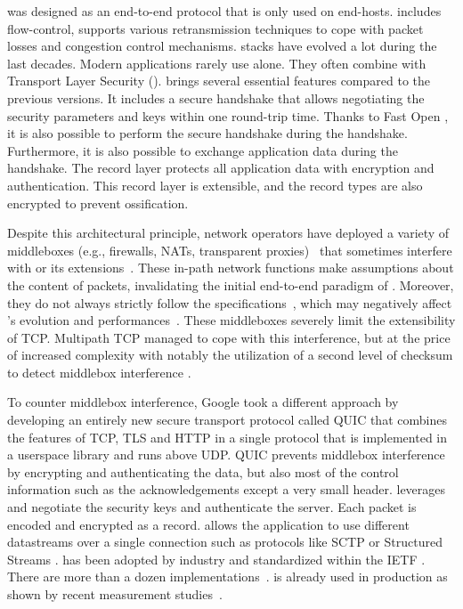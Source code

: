 

\tcp was designed as an end-to-end protocol that is only used on end-hosts.
\tcp includes flow-control, supports various retransmission techniques to cope with packet losses and congestion control mechanisms. \tcp stacks have evolved a lot during the last decades. Modern applications rarely use \tcp alone. They
often combine \tcp with Transport Layer Security (\tls). 
 \cite{rfc8446} brings several essential features compared to the previous versions. It
includes a secure handshake that allows negotiating the security parameters and
keys within one round-trip time. Thanks to \tcp Fast Open
\cite{radhakrishnan2011tcp}, it is also possible to perform the secure handshake
during the \tcp handshake. Furthermore, it is also possible to exchange
application data during the handshake. The  record layer protects all
application data with encryption and authentication. This record layer is
extensible, and the \tls record types are also encrypted to prevent
ossification.

Despite this architectural principle, network operators have deployed a variety
of middleboxes (e.g., firewalls, NATs, transparent proxies)~\cite{mCloud} that
sometimes interfere with \tcp or its extensions~\cite{medina2004measuring,
honda2011still, edeline2019bottom}. These in-path network functions make
assumptions about the content of \tcp packets, invalidating the initial
end-to-end paradigm of \tcp. Moreover, they do not always strictly follow the
\tcp specifications~\cite{honda2011still, hesmans2013tcp}, which may negatively
affect \tcp's evolution and performances~\cite{edeline2020evaluating}. These
middleboxes severely limit the extensibility of TCP. Multipath TCP \cite{rfc8684,raiciu2012hard}
managed to cope with this interference, but at the price of increased complexity
with notably the utilization of a second level of checksum to detect middlebox
interference \cite{raiciu2012hard,hesmans2013tcp}.

To counter middlebox interference, Google took a different approach by developing an
entirely new secure transport protocol called QUIC \cite{langley2017quic} that
combines the features of TCP, TLS and HTTP in a single protocol that is implemented
in a userspace library and runs above UDP. QUIC prevents middlebox interference
by encrypting and authenticating the data, but also most of the control
information such as the acknowledgements except a very small header. \quic
leverages  \cite{rfc8446} and negotiate the security keys and authenticate
the server. Each \quic packet is encoded and encrypted as a \tls record. \quic allows the
application to use different datastreams over a single
connection such as protocols like
SCTP \cite{rfc4960} or Structured Streams \cite{ford2007structured}.
\quic has
been adopted by industry and standardized within the IETF \cite{rfc9000}.
There are more than a dozen \quic implementations~\cite{quicimplem,marx2020same}. \quic is
already used in production as shown by recent measurement
studies~\cite{trevisan2020five}.

